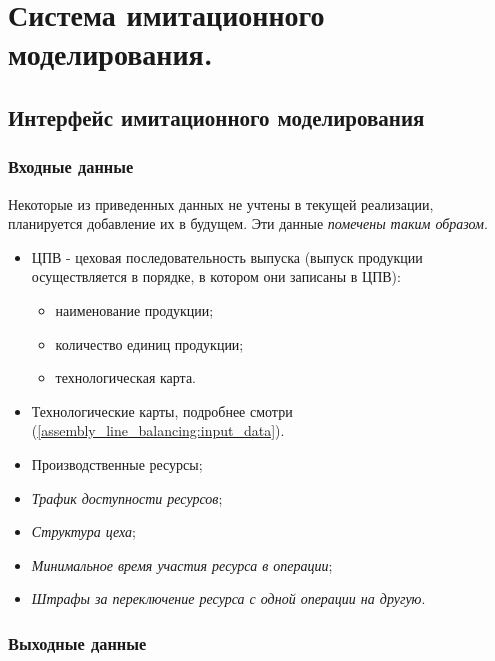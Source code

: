 \chapter{Система имитационного моделирования.}

\section{Интерфейс имитационного моделирования}

\subsection{Входные данные}
Некоторые из приведенных данных не учтены в текущей реализации, планируется добавление их в будущем. Эти данные \textit{помечены таким образом}.

\begin{itemize}
	\item ЦПВ - цеховая последовательность выпуска (выпуск продукции осуществляется в порядке, в котором они записаны в ЦПВ):
		\begin{itemize}
			\item наименование продукции;
			\item количество единиц продукции;	
			\item технологическая карта.
		\end{itemize}			
	\item Технологические карты, подробнее смотри (\ref{assembly_line_balancing:input_data}).
	\item Производственные ресурсы;
	\item \textit{Трафик доступности ресурсов};
	\item \textit{Структура цеха};
	\item \textit{Минимальное время участия ресурса в операции};
	\item \textit{Штрафы за переключение ресурса с одной операции на другую}. 
\end{itemize}

\subsection{Выходные данные}

